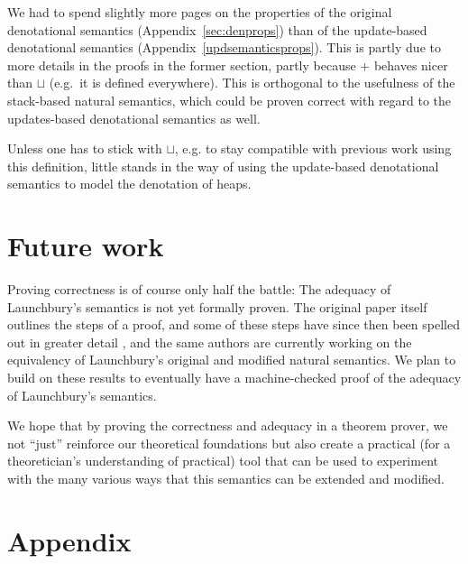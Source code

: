 \documentclass{jfp1}
\theoremstyle{nonumberbreak}
\begin{document}
We had to spend slightly more pages on the properties of the original denotational semantics (Appendix~\ref{sec:denprops}) than of the update-based denotational semantics (Appendix~\ref{updsemanticsprops}). This is partly due to more details in the proofs in the former section, partly because $+$ behaves nicer than $\sqcup$ (e.g.\ it is defined everywhere). This is orthogonal to the usefulness of the stack-based natural semantics, which could be proven correct with regard to the updates-based denotational semantics as well.

Unless one has to stick with $\sqcup$, e.g. to stay compatible with previous work using this definition, little stands in the way of using the update-based denotational semantics to model the denotation of heaps.

\section{Future work}

Proving correctness is of course only half the battle: The adequacy of Launchbury’s semantics is not yet formally proven. The original paper itself outlines the steps of a proof, and some of these steps have since then been spelled out in greater detail \cite{functionspaces}, and the same authors are currently working on the equivalency of Launchbury’s original and modified natural semantics. We plan to build on these results to eventually have a machine-checked proof of the adequacy of Launchbury’s semantics.

We hope that by proving the correctness and adequacy in a theorem prover, we not “just” reinforce our theoretical foundations but also create a practical (for a theoretician’s understanding of practical) tool that can be used to experiment with the many various ways that this semantics can be extended and modified.






\appendix

\section{Appendix}
\end{document}

